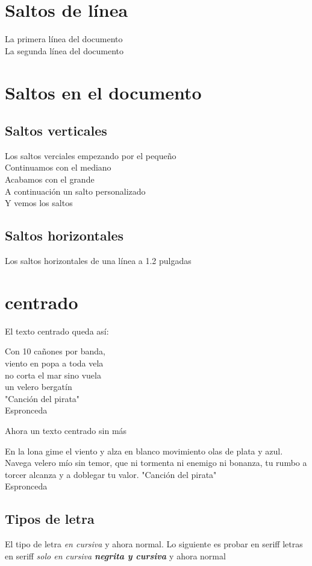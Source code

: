 \documentclass[10pt,a4paper]{book}
\begin{document}
\chapter{Saltos de línea}
 La primera línea del documento \\
 La segunda línea del documento
\chapter{Saltos en el documento}

	\section{Saltos verticales}
	 Los saltos verciales empezando por el pequeño \smallskip \\
	 Continuamos con el mediano \medskip \\
	 Acabamos con el grande \bigskip \\
	 A continuación un salto personalizado \vspace{1cm} \\
	 Y vemos los saltos 
	
	\section{Saltos horizontales}
	 Los saltos horizontales de una línea a \hspace{1.2in} 1.2 pulgadas
\chapter{centrado}
 El texto centrado queda así:
	\begin{center}
	 Con 10 cañones por banda, \\
	 viento en popa a toda vela \\
	 no corta el mar sino vuela \\
 	 un velero bergatín \vspace{2cm}\\ 
 	 
 	 "Canción del pirata" \\
 	 Espronceda
		
	\end{center}
	 Ahora un texto centrado sin más
	\begin{center}
	 En la lona gime el viento y alza en blanco movimiento olas de plata 
	 y azul. Navega velero mío sin temor, que ni tormenta ni enemigo ni 
	 bonanza, tu rumbo a torcer alcanza y a doblegar tu valor.
 	 "Canción del pirata" \\
 	 Espronceda
		
	\end{center}
	\section{Tipos de letra}
	 El tipo de letra {
	 	\em en cursiva
	 } y ahora normal. Lo siguiente es probar 
	 en seriff {
	 	\sf letras en seriff {
	 		\em solo en cursiva {
	 			\bf negrita y cursiva	 		
	 		}
	 	}
	 } y ahora normal
\end{document}
